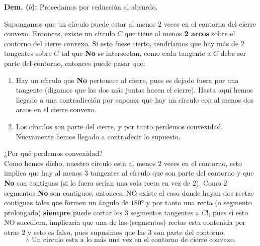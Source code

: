 \textbf{Dem. ($b$):} Procedamos por reducción al absurdo.

Supongamos que un círculo puede estar al menos $2$ veces en el contorno del cierre convexo.
Entonces, existe un círculo $C$ que tiene al menos \textbf{2 arcos} sobre el contorno del
cierre convexo. Si esto fuese cierto, tendríamos que hay más de $2$ tangentes sobre $C$ tal
que \textbf{No} se intersectan, como cada tangente a $C$ debe ser parte del contorno,
 entonces puede pasar que:
\begin{enumerate}
\item Hay un círculo que \textbf{No} pertenece al cierre, pues es dejado fuera por una tangente (digamos
  que las dos más juntas hacen el cierre). Hasta aquí hemos llegado a una contradicción por suponer que
  hay un círculo con al menos dos arcos en el cierre convexo.
\item Los círculos son parte del cierre, y por tanto perdemos convexidad. Nuevamente hemos llegado
  a contradecir lo supuesto.
\end{enumerate}

¿Por qué perdemos convexidad?\\
Como hemos dicho, nuestro círculo esta al menos $2$ veces en el contorno, esto implica que
hay al menos $3$ tangentes al círculo que son parte del contorno y que \textbf{No} son
contiguas (si lo fuera serían una sola recta en vez de $2$). Como $2$ segmentos \textbf{No}
son contiguos, entonces, NO existe el caso donde hayan dos rectas contiguas tales que formen
un ángulo de $180°$
y por tanto una recta (o segmento prolongado) \textbf{siempre} puede cortar los $3$ segmentos
tangentes a $C!$, pues si esto NO sucediera, implicaría que una de las (segmentos) rectas
esta contenida por otras $2$ y esto es falso, pues supusimos que las $3$ son parte del contorno.\\
\[
\therefore \text{ Un círculo esta a lo más una vez en el contorno de cierre convexo.}
\]
